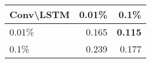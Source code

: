 \begin{tabular}{lrr}
\toprule
Conv\textbackslash LSTM & 0.01\% & 0.1\% \\
\midrule
0.01\% & 0.165 & \bfseries 0.115 \\
0.1\% & 0.239 & 0.177 \\
\bottomrule
\end{tabular}
